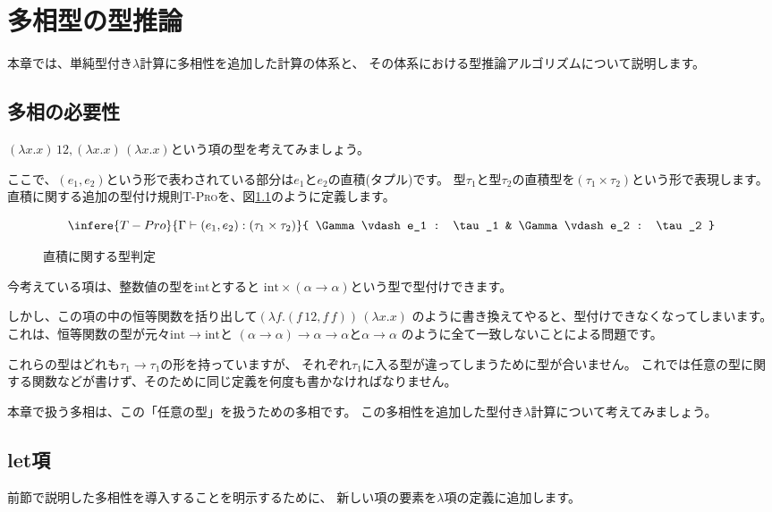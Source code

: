 
\chapter{多相型の型推論}

本章では、単純型付き$\lambda$計算に多相性を追加した計算の体系と、
その体系における型推論アルゴリズムについて説明します。

\section{多相の必要性}

$(\lambda x. x) \, 12, (\lambda x . x) \, (\lambda x . x)$という項の型を考えてみましょう。

ここで、$(e_1, e_2)$という形で表わされている部分は$e_1$と$e_2$の直積(タプル)です。
型$\tau_1$と型$\tau_2$の直積型を$(\tau_1 \times \tau_2)$という形で表現します。
直積に関する追加の型付け規則\textsc{T-Pro}を、図\ref{fig:product-type-judgement}のように定義します。

\begin{figure}[htbp]
  \[
    \infere{T-Pro}{
      \Gamma \vdash (e_1, e_2) : (\tau_1 \times \tau_2)
    }{
      \Gamma \vdash e_1 : \tau_1 &
      \Gamma \vdash e_2 : \tau_2
    }
  \]
  \caption{直積に関する型判定}
  \label{fig:product-type-judgement}
\end{figure}

今考えている項は、整数値の型を$\mathrm{int}$とすると
$\mathrm{int} \times (\alpha \to \alpha)$という型で型付けできます。

しかし、この項の中の恒等関数を括り出して$(\lambda f .(f \, 12, f \, f)) \, (\lambda x . x)$
のように書き換えてやると、型付けできなくなってしまいます。
これは、恒等関数の型が元々$\mathrm{int} \to \mathrm{int}$と
$(\alpha \to \alpha) \to \alpha \to \alpha$と$\alpha \to \alpha$
のように全て一致しないことによる問題です。

これらの型はどれも$\tau_1 \to \tau_1$の形を持っていますが、
それぞれ$\tau_1$に入る型が違ってしまうために型が合いません。
これでは任意の型に関する関数などが書けず、そのために同じ定義を何度も書かなければなりません。

本章で扱う多相は、この「任意の型」を扱うための多相です。
この多相性を追加した型付き$\lambda$計算について考えてみましょう。

\section{let項}

前節で説明した多相性を導入することを明示するために、
新しい項の要素を$\lambda$項の定義に追加します。

